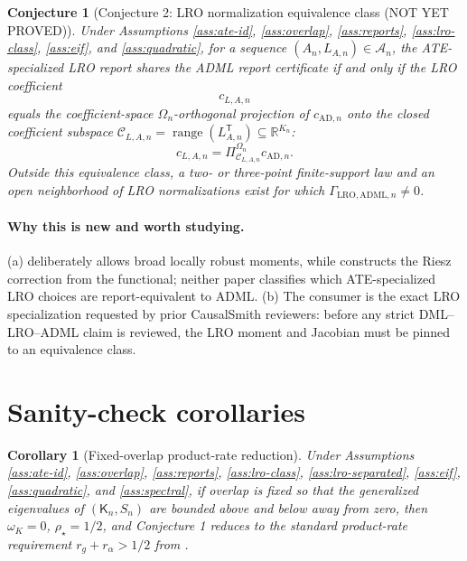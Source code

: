 \documentclass[11pt]{article}
\newcommand{\transpose}{\mathsf{T}}
\newcommand{\R}{\mathbb{R}}
\theoremstyle{definition}
\theoremstyle{plain}
\newtheorem{conjecture}{Conjecture}
\newtheorem{corollary}{Corollary}
\theoremstyle{remark}
\begin{document}
\begin{conjecture}[Conjecture 2: LRO normalization equivalence class (NOT YET PROVED)]\label{conj:lro-class}
Under Assumptions \ref{ass:ate-id}, \ref{ass:overlap}, \ref{ass:reports},
\ref{ass:lro-class}, \ref{ass:eif}, and \ref{ass:quadratic}, for a sequence
\((A_n,L_{A,n})\in\mathcal A_n\), the ATE-specialized LRO
report shares the ADML report certificate if and only if the LRO coefficient
\[
c_{L,A,n}
\]
equals the coefficient-space \(\Omega_n\)-orthogonal projection of
\(c_{\mathrm{AD},n}\) onto the closed coefficient subspace
\(\mathcal C_{L,A,n}=\operatorname{range}(L_{A,n}^{\transpose})
\subseteq\R^{K_n}\):
\[
c_{L,A,n}=\Pi_{\mathcal C_{L,A,n}}^{\Omega_n}c_{\mathrm{AD},n}.
\]
Outside this equivalence class, a two- or three-point finite-support law and
an open neighborhood of LRO normalizations exist for which
\(\Gamma_{\mathrm{LRO},\mathrm{ADML},n}\ne 0\).
\end{conjecture}
\paragraph{Why this is new and worth studying.}
(a) \citet{ChernozhukovEscancianoIchimuraNeweyRobins2022LRO} deliberately
allows broad locally robust moments, while
\citet{ChernozhukovNeweySingh2022ADML} constructs the Riesz correction from
the functional; neither paper classifies which ATE-specialized LRO choices are
report-equivalent to ADML.  (b) The consumer is the exact LRO specialization
requested by prior CausalSmith reviewers: before any strict DML--LRO--ADML
claim is reviewed, the LRO moment and Jacobian must be pinned to an
equivalence class.

\section{Sanity-check corollaries}
\begin{corollary}[Fixed-overlap product-rate reduction]\label{cor:fixed-overlap}
Under Assumptions \ref{ass:ate-id}, \ref{ass:overlap}, \ref{ass:reports},
\ref{ass:lro-class}, \ref{ass:lro-separated}, \ref{ass:eif},
\ref{ass:quadratic}, and \ref{ass:spectral}, if overlap is fixed
so that the generalized eigenvalues of \((\mathsf K_n,S_n)\) are bounded above and
below away from zero, then \(\omega_K=0\), \(\rho_\star=1/2\), and
Conjecture 1 reduces to the standard product-rate requirement
\(r_g+r_\alpha>1/2\) from
\citet{ChernozhukovEtAl2018ECTJ}.
\end{corollary}
\end{document}
